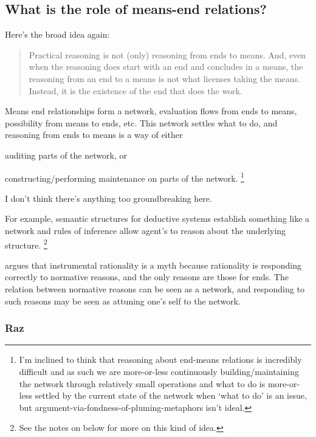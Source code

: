 \documentclass[10pt]{article}
\newcommand{\hozlinedash}[0]{%
  \noindent\hdashrule[0.5ex][c]{\textwidth}{.1pt}{2.5pt}
}
\begin{document}
\subsection*{What is the role of means-end relations?}
\label{sec:conclusion}

Here's the broad idea again:
\begin{quote}
  Practical reasoning is not (only) reasoning from ends to means.
  And, even when the reasoning does start with an end and concludes in a means, the reasoning from an end to a means is not what licenses taking the means.
  Instead, it is the existence of the end that does the work.
\end{quote}


Means end relationships form a network, evaluation flows from ends to means, possibility from means to ends, etc.
This network settles what to do, and reasoning from ends to means is a way of either
\begin{enumerate*}[label=\alph*)]
\item auditing parts of the network, or
\item constructing/performing maintenance on parts of the network.\nolinebreak
  \footnote{I'm inclined to think that reasoning about end-means relations is incredibly difficult and as such we are more-or-less continuously building/maintaining the network through relatively small operations and what to do is more-or-less settled by the current state of the network when `what to do' is an issue, but argument-via-fondness-of-pluming-metaphors isn't ideal.}
\end{enumerate*}

I don't think there's anything too groundbreaking here.

For example, semantic structures for deductive systems establish something like a network and rules of inference allow agent's to reason about the underlying structure.\nolinebreak
\footnote{See the notes on \citeauthor{Von-Wright:1972aa} below for more on this kind of idea.}

\citeauthor{Raz:2005aa} argues that instrumental rationality is a myth because rationality is responding correctly to normative reasons, and the only reasons are those for ends.
The relation between normative reasons can be seen as a network, and responding to such reasons may be seen as attuning one's self to the network.

\hozlinedash

\subsubsection*{Raz}
\label{sec:raz}
\end{document}
